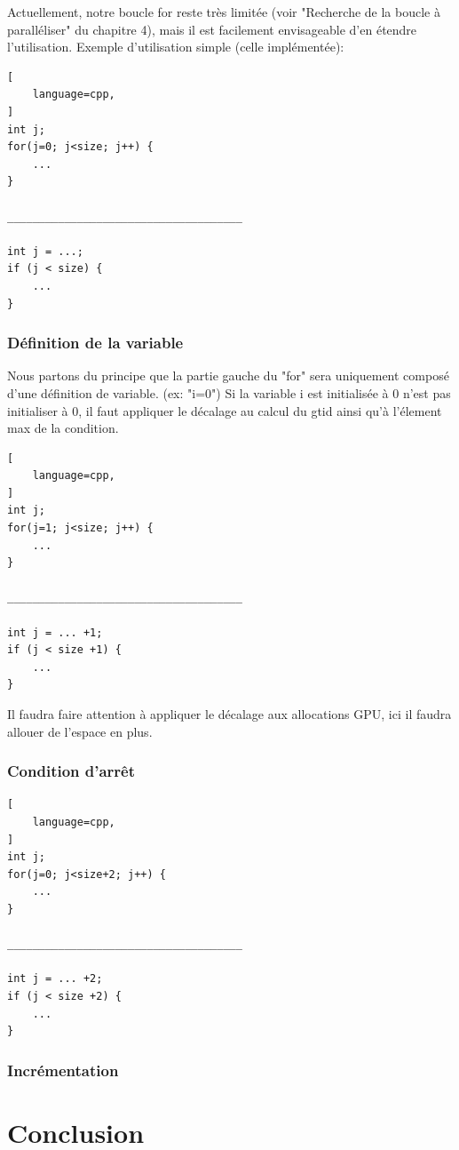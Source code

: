 \documentclass{article}
\begin{document}
	Actuellement, notre boucle for reste très limitée (voir "Recherche de la boucle à paralléliser" du chapitre 4), mais il est facilement envisageable d'en étendre l'utilisation.
	Exemple d'utilisation simple (celle implémentée):
			\begin{lstlisting}[
    language=cpp,
]
int j;
for(j=0; j<size; j++) {
	...
}

_____________________________________

int j = ...;
if (j < size) {
	...
}
	\end{lstlisting}
	
	\subsubsection{Définition de la variable}
	
	Nous partons du principe que la partie gauche du "for" sera uniquement composé d'une définition de variable. (ex: "i=0")
	Si la variable i est initialisée à 0 n'est pas initialiser à 0, il faut appliquer le décalage au calcul du gtid ainsi qu'à l'élement max de la condition.
	
	\begin{lstlisting}[
    language=cpp,
]
int j;
for(j=1; j<size; j++) {
	...
}

_____________________________________

int j = ... +1;
if (j < size +1) {
	...
}
	\end{lstlisting}
	Il faudra faire attention à appliquer le décalage aux allocations GPU, ici il faudra allouer de l'espace en plus.
	\subsubsection{Condition d'arrêt}

			\begin{lstlisting}[
    language=cpp,
]
int j;
for(j=0; j<size+2; j++) {
	...
}

_____________________________________

int j = ... +2;
if (j < size +2) {
	...
}
	\end{lstlisting}
	

	\subsubsection{Incrémentation}
	

	\section{Conclusion}
	
\end{document}
